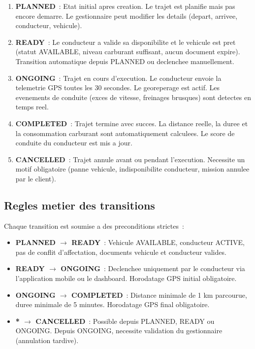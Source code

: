 \documentclass[12pt,a4paper]{report}
\begin{document}
\begin{enumerate}[leftmargin=2cm]
  \item \textbf{PLANNED}~: Etat initial apres creation. Le trajet est
        planifie mais pas encore demarre. Le gestionnaire peut modifier
        les details (depart, arrivee, conducteur, vehicule).
        
  \item \textbf{READY}~: Le conducteur a valide sa disponibilite et le
        vehicule est pret (statut AVAILABLE, niveau carburant suffisant,
        aucun document expire). Transition automatique depuis PLANNED
        ou declenchee manuellement.
        
  \item \textbf{ONGOING}~: Trajet en cours d'execution. Le conducteur envoie
        la telemetrie GPS toutes les 30 secondes. Le georeperage est actif.
        Les evenements de conduite (exces de vitesse, freinages brusques)
        sont detectes en temps reel.
        
  \item \textbf{COMPLETED}~: Trajet termine avec succes. La distance reelle,
        la duree et la consommation carburant sont automatiquement calculees.
        Le score de conduite du conducteur est mis a jour.
        
  \item \textbf{CANCELLED}~: Trajet annule avant ou pendant l'execution.
        Necessite un motif obligatoire (panne vehicule, indisponibilite
        conducteur, mission annulee par le client).
\end{enumerate}

\subsection{Regles metier des transitions}

Chaque transition est soumise a des preconditions strictes~:

\begin{itemize}[leftmargin=2cm]
  \item \textbf{PLANNED $\to$ READY}~: Vehicule AVAILABLE, conducteur ACTIVE,
        pas de conflit d'affectation, documents vehicule et conducteur valides.
        
  \item \textbf{READY $\to$ ONGOING}~: Declenchee uniquement par le conducteur
        via l'application mobile ou le dashboard. Horodatage GPS initial obligatoire.
        
  \item \textbf{ONGOING $\to$ COMPLETED}~: Distance minimale de 1 km parcourue,
        duree minimale de 5 minutes. Horodatage GPS final obligatoire.
        
  \item \textbf{* $\to$ CANCELLED}~: Possible depuis PLANNED, READY ou ONGOING.
        Depuis ONGOING, necessite validation du gestionnaire (annulation tardive).
\end{itemize}
\end{document}
